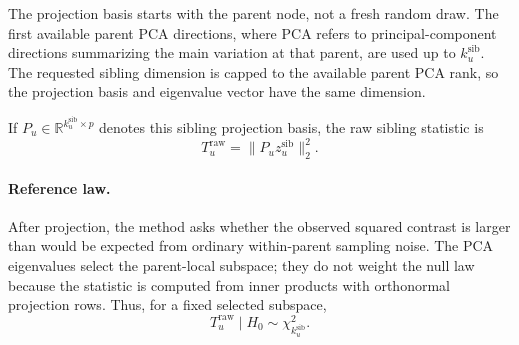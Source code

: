 The projection basis starts with the parent node, not a fresh random draw. The
first available parent PCA directions, where PCA refers to principal-component
directions summarizing the main variation at that parent, are used up to
$k_u^{\mathrm{sib}}$. The requested sibling dimension is capped to the available
parent PCA rank, so the projection basis and eigenvalue vector have the same
dimension.

If $P_u \in \mathbb{R}^{k_u^{\mathrm{sib}} \times p}$ denotes this sibling
projection basis, the raw sibling statistic is
\begin{equation}
T_u^{\mathrm{raw}}
=
\|P_u z_u^{\mathrm{sib}}\|_2^2.
\end{equation}

\paragraph{Reference law.}
After projection, the method asks whether the observed squared contrast is
larger than would be expected from ordinary within-parent sampling noise. The
PCA eigenvalues select the parent-local subspace; they do not weight the null
law because the statistic is computed from inner products with orthonormal
projection rows. Thus, for a fixed selected subspace,
\[
T_u^{\mathrm{raw}} \mid H_0 \sim \chi^2_{k_u^{\mathrm{sib}}}.
\]

